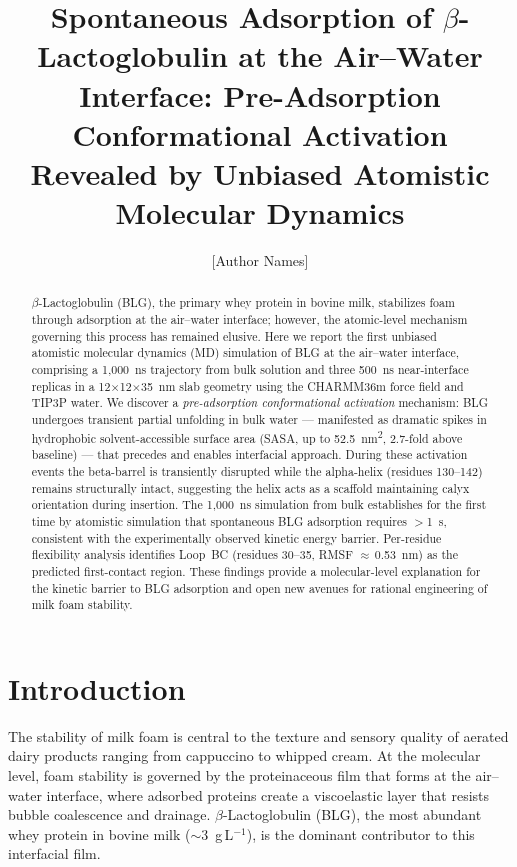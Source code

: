 \documentclass[journal=langd5,manuscript=article]{achemso}
\author{[Author Names]}
\affiliation{[Institution, Department, Address]}
\title{Spontaneous Adsorption of \texorpdfstring{$\beta$}{beta}-Lactoglobulin
       at the Air--Water Interface: Pre-Adsorption Conformational Activation
       Revealed by Unbiased Atomistic Molecular Dynamics}
\begin{document}

\begin{abstract}
\noindent
$\beta$-Lactoglobulin (BLG), the primary whey protein in bovine milk, stabilizes
foam through adsorption at the air--water interface; however, the atomic-level
mechanism governing this process has remained elusive. Here we report the first
unbiased atomistic molecular dynamics (MD) simulation of BLG at the air--water
interface, comprising a 1{,}000~ns trajectory from bulk solution and three
500~ns near-interface replicas in a 12$\times$12$\times$35~nm slab geometry
using the CHARMM36m force field and TIP3P water. We discover a \emph{pre-adsorption
conformational activation} mechanism: BLG undergoes transient partial unfolding
in bulk water — manifested as dramatic spikes in hydrophobic solvent-accessible
surface area (SASA, up to \SI{52.5}{\nano\metre\squared}, 2.7-fold above
baseline) — that precedes and enables interfacial approach. During these
activation events the beta-barrel is transiently disrupted while the
alpha-helix (residues 130--142) remains structurally intact, suggesting the
helix acts as a scaffold maintaining calyx orientation during insertion.
The 1{,}000~ns simulation from bulk establishes for the first time by atomistic
simulation that spontaneous BLG adsorption requires $>$1~\textmu{}s, consistent
with the experimentally observed kinetic energy barrier. Per-residue flexibility
analysis identifies Loop~BC (residues 30--35, RMSF $\approx$\,0.53~nm) as the
predicted first-contact region. These findings provide a molecular-level
explanation for the kinetic barrier to BLG adsorption and open new avenues for
rational engineering of milk foam stability.
\end{abstract}

\section{Introduction}

The stability of milk foam is central to the texture and sensory quality of
aerated dairy products ranging from cappuccino to whipped cream. At the molecular
level, foam stability is governed by the proteinaceous film that forms at the
air--water interface, where adsorbed proteins create a viscoelastic layer that
resists bubble coalescence and drainage.\cite{Dickinson1999,BertonCarabin2018}
$\beta$-Lactoglobulin (BLG), the most abundant whey protein in bovine milk
($\sim$3~g\,L$^{-1}$), is the dominant contributor to this interfacial
film.\cite{Cornec1999,Bolisetty2022}
\end{document}
